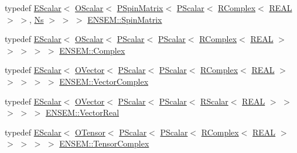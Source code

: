 \begin{DoxyCompactItemize}
\item 
typedef \mbox{\hyperlink{classENSEM_1_1EScalar}{E\+Scalar}}$<$ \mbox{\hyperlink{classENSEM_1_1OScalar}{O\+Scalar}}$<$ \mbox{\hyperlink{classENSEM_1_1PSpinMatrix}{P\+Spin\+Matrix}}$<$ \mbox{\hyperlink{classENSEM_1_1PScalar}{P\+Scalar}}$<$ \mbox{\hyperlink{classENSEM_1_1RComplex}{R\+Complex}}$<$ \mbox{\hyperlink{namespaceENSEM_a6dd9aa6508168f545c861787e63ddd1e}{R\+E\+AL}} $>$ $>$, \mbox{\hyperlink{namespaceENSEM_a6f05e048f9b2eb1a19131074f8abc25f}{Ns}} $>$ $>$ $>$ \mbox{\hyperlink{group__defs_gad066768e154e358a7f3c0708c774be29}{E\+N\+S\+E\+M\+::\+Spin\+Matrix}}
\item 
typedef \mbox{\hyperlink{classENSEM_1_1EScalar}{E\+Scalar}}$<$ \mbox{\hyperlink{classENSEM_1_1OScalar}{O\+Scalar}}$<$ \mbox{\hyperlink{classENSEM_1_1PScalar}{P\+Scalar}}$<$ \mbox{\hyperlink{classENSEM_1_1PScalar}{P\+Scalar}}$<$ \mbox{\hyperlink{classENSEM_1_1RComplex}{R\+Complex}}$<$ \mbox{\hyperlink{namespaceENSEM_a6dd9aa6508168f545c861787e63ddd1e}{R\+E\+AL}} $>$ $>$ $>$ $>$ $>$ \mbox{\hyperlink{group__defs_gabaa4aa11d5212d34042d08bf0b2f9cc0}{E\+N\+S\+E\+M\+::\+Complex}}
\item 
typedef \mbox{\hyperlink{classENSEM_1_1EScalar}{E\+Scalar}}$<$ \mbox{\hyperlink{classENSEM_1_1OVector}{O\+Vector}}$<$ \mbox{\hyperlink{classENSEM_1_1PScalar}{P\+Scalar}}$<$ \mbox{\hyperlink{classENSEM_1_1PScalar}{P\+Scalar}}$<$ \mbox{\hyperlink{classENSEM_1_1RComplex}{R\+Complex}}$<$ \mbox{\hyperlink{namespaceENSEM_a6dd9aa6508168f545c861787e63ddd1e}{R\+E\+AL}} $>$ $>$ $>$ $>$ $>$ \mbox{\hyperlink{group__defs_gab151d837d71acacce0e1c38e91e04fa3}{E\+N\+S\+E\+M\+::\+Vector\+Complex}}
\item 
typedef \mbox{\hyperlink{classENSEM_1_1EScalar}{E\+Scalar}}$<$ \mbox{\hyperlink{classENSEM_1_1OVector}{O\+Vector}}$<$ \mbox{\hyperlink{classENSEM_1_1PScalar}{P\+Scalar}}$<$ \mbox{\hyperlink{classENSEM_1_1PScalar}{P\+Scalar}}$<$ \mbox{\hyperlink{classENSEM_1_1RScalar}{R\+Scalar}}$<$ \mbox{\hyperlink{namespaceENSEM_a6dd9aa6508168f545c861787e63ddd1e}{R\+E\+AL}} $>$ $>$ $>$ $>$ $>$ \mbox{\hyperlink{group__defs_ga3ccd78d00f8c76c389577cc0dbe460fc}{E\+N\+S\+E\+M\+::\+Vector\+Real}}
\item 
typedef \mbox{\hyperlink{classENSEM_1_1EScalar}{E\+Scalar}}$<$ \mbox{\hyperlink{classENSEM_1_1OTensor}{O\+Tensor}}$<$ \mbox{\hyperlink{classENSEM_1_1PScalar}{P\+Scalar}}$<$ \mbox{\hyperlink{classENSEM_1_1PScalar}{P\+Scalar}}$<$ \mbox{\hyperlink{classENSEM_1_1RComplex}{R\+Complex}}$<$ \mbox{\hyperlink{namespaceENSEM_a6dd9aa6508168f545c861787e63ddd1e}{R\+E\+AL}} $>$ $>$ $>$ $>$ $>$ \mbox{\hyperlink{group__defs_gaa7d4b94401ce3fe4074e5133299e9924}{E\+N\+S\+E\+M\+::\+Tensor\+Complex}}

\end{DoxyCompactItemize}
